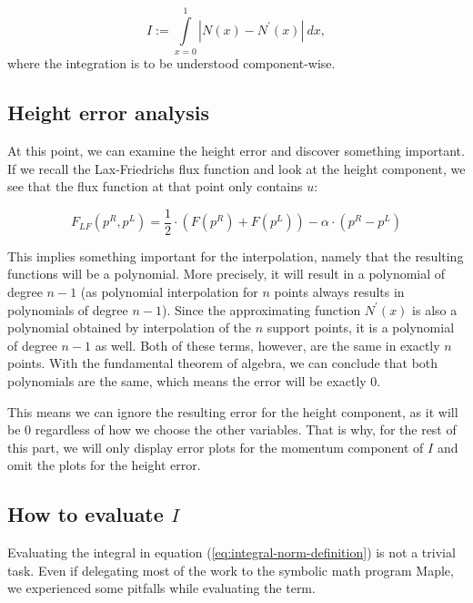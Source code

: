 \documentclass[a4paper, twoside]{article}
\begin{document}
\begin{equation}
  \label{eq:integral-norm-definition}
  I := \int\limits_{x=0}^1 | N\left(x\right) - N^\prime\left(x\right) |\  dx,
\end{equation}
where the integration is to be understood component-wise.

\subsection{Height error analysis}
\label{sec:height-error-p2}

At this point, we can examine the height error and discover something important.
If we recall the Lax-Friedrichs flux function and look at the height component, we see that the flux function at that point only contains $u$:

\begin{equation}
  \label{eq:lax-friedrich-definition}
  F_{LF}(p^R,p^L) = \dfrac{1}{2}\cdot (F(p^R) + F(p^L)) - \alpha \cdot (p^R - p^L)
\end{equation}

This implies something important for the interpolation, namely that the resulting functions will be a polynomial.
More precisely, it will result in a polynomial of degree $n-1$ (as polynomial interpolation for $n$ points always results in polynomials of degree $n-1$).
Since the approximating function $N^\prime\left(x\right)$ is also a polynomial obtained by interpolation of the $n$ support points, it is a polynomial of degree $n-1$ as well.
Both of these terms, however, are the same in exactly $n$ points.
With the fundamental theorem of algebra, we can conclude that both polynomials are the same, which means the error will be exactly 0.

This means we can ignore the resulting error for the height component, as it will be 0 regardless of how we choose the other variables.
That is why, for the rest of this part, we will only display error plots for the momentum component of $I$ and omit the plots for the height error.

\subsection{\texorpdfstring{How to evaluate $I$}{How to evaluate I}}
\label{sec:how-to-eval-I}

Evaluating the integral in equation (\ref{eq:integral-norm-definition}) is not a trivial task.
Even if delegating most of the work to the symbolic math program Maple, we experienced some pitfalls while evaluating the term.
\end{document}
